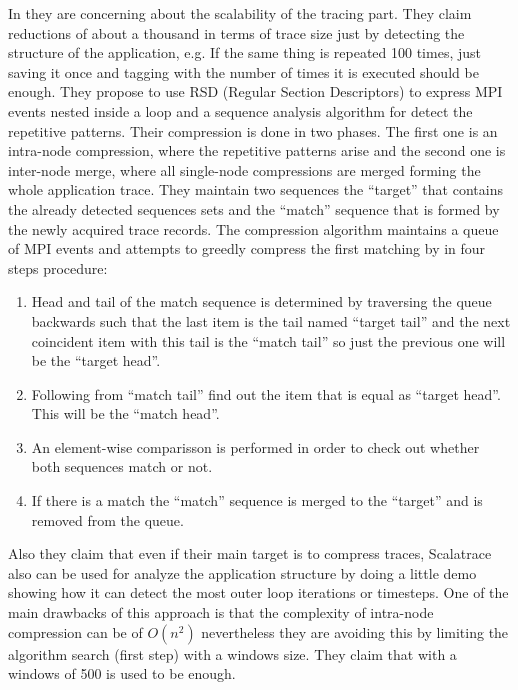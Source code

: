 In \cite{noeth2009scalatrace} they are concerning about the scalability of the
tracing part. They claim reductions of about a
thousand in terms of trace size just by detecting the structure of the
application, e.g. If the same thing is repeated 100 times, just saving it once
and tagging with the number of times it is executed should be enough. They
propose to use RSD (Regular Section Descriptors) to express MPI events nested
inside a loop and a sequence analysis algorithm for detect the repetitive 
patterns. Their compression
is done in two phases. The first one is an intra-node compression, where the
repetitive patterns arise and the second one is inter-node merge, where all
single-node compressions are merged forming the whole application trace.
They maintain two sequences the ``target'' that contains the already detected
sequences sets and the ``match'' sequence that is formed by the newly acquired
trace records. The compression algorithm maintains a queue of MPI events and 
attempts to greedly compress the first matching by  in four steps procedure:
\begin{enumerate}[label=\roman*)]
  \item Head and tail of the match sequence is determined by traversing the
    queue backwards such that the last item is the tail named ``target tail''
    and the next coincident item with this tail is the ``match tail'' so just
    the previous one will be the ``target head''.
  \item Following from ``match tail'' find out the item that is equal as
    ``target head''. This will be the ``match head''.
  \item An element-wise comparisson is performed in order to check out whether 
    both sequences match or not.
  \item If there is a match the ``match'' sequence is merged to the ``target''
    and is removed from the queue.
\end{enumerate}
Also they claim
that even if their main target is to compress traces, Scalatrace also can be
used for analyze the application structure by doing a little demo showing how it
can detect the most outer loop iterations or timesteps. One of the main
drawbacks of this approach is that the complexity of intra-node compression 
can be of $O(n^2)$ nevertheless they are avoiding this by
limiting the algorithm search (first step) with a windows size. They claim that
with a windows of 500 is used to be enough. 

